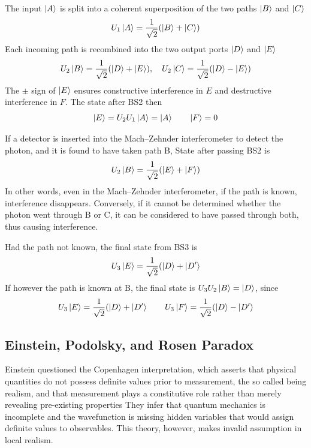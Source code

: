 \documentclass[../../../main.tex]{subfiles}
\begin{document}
The input $\ket{A}$ is split into a coherent superposition of the two paths $\ket{B}$ and $\ket{C}$
\begin{equation*}
  U_1 \ket{A}  = \frac{1}{\sqrt{2}} (\ket{B} + \ket{C})
\end{equation*}
Each incoming path is recombined into the two output ports $\ket{D}$ and $\ket{E}$
\begin{equation*}
  U_2 \ket{B}  = \frac{1}{\sqrt{2}} (\ket{D} + \ket{E}), \quad
  U_2 \ket{C}  = \frac{1}{\sqrt{2}} (\ket{D} - \ket{E})
\end{equation*}
The $\pm$ sign of $\ket{E}$ ensures constructive interference in $E$ and destructive interference in $F$.
The state after BS2 then
\begin{equation*}
  \ket{E }=U_2U_1 \ket{A} = \ket{A} \qquad \ket{F}=0
\end{equation*}

If a detector is inserted into the Mach–Zehnder interferometer to detect the photon, and it is found to have taken path B, State after passing BS2 is
\begin{equation*}
  U_2 \ket{B}  = \frac{1}{\sqrt{2}} (\ket{E} + \ket{F})
\end{equation*}
In other words, even in the Mach–Zehnder interferometer, if the path is known, interference disappears.
Conversely, if it cannot be determined whether the photon went through B or C, it can be considered to have passed through both, thus causing interference.

Had the path not known, the final state from BS3 is
\begin{equation*}
  U_3\ket{E}  = \frac{1}{\sqrt{2}} (\ket{D} + \ket{D'}
\end{equation*}
If however the path is known at B, the final state is $U_3U_2 \ket{B}= \ket{D}$, since
\begin{equation*}
  U_3\ket{E}  = \frac{1}{\sqrt{2}} (\ket{D} + \ket{D'}  \qquad
  U_3\ket{F}  = \frac{1}{\sqrt{2}} (\ket{D} - \ket{D'}
\end{equation*}

\subsection{Einstein, Podolsky, and Rosen Paradox}
Einstein questioned the Copenhagen interpretation, which asserts that physical quantities do not possess definite values prior to measurement, the so called being realism, and that measurement plays a constitutive role rather than merely revealing pre-existing properties
They infer that quantum mechanics is incomplete and the wavefunction is missing hidden variables that would assign definite values to observables.
This theory, however, makes invalid assumption in local realism.
\end{document}
